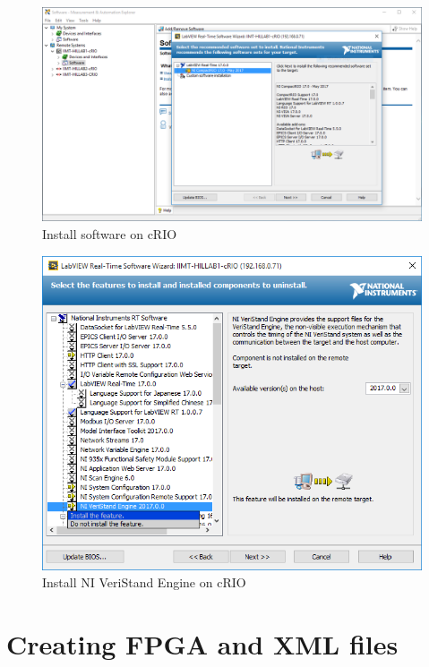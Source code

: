 \documentclass[a4paper,english]{report}
\begin{document}
\begin{figure}[htb!]
	\centering
	\includegraphics[scale=0.4]{fig/crio_install_software.png}
	\caption{Install software on cRIO}
	\label{fig:crio_install_software}
\end{figure}
\begin{figure}[htb!]
	\centering
	\includegraphics[scale=0.6]{fig/crio_custom_install.png}
	\caption{Install NI VeriStand Engine on cRIO}
	\label{fig:crio_custom_install}
\end{figure}
\section{Creating FPGA and XML files}
\end{document}
